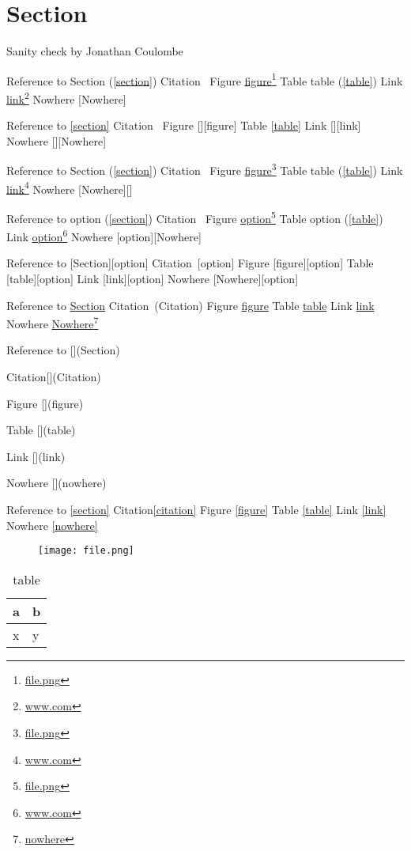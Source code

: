 
\def\mytitle{MultiMarkdown Sanity Test}

\part{Section}
\label{section}

Sanity check by Jonathan Coulombe

Reference to Section (\autoref{section})
Citation~\cite{Citation}
Figure \href{file.png}{figure}\footnote{\href{file.png}{file.png}}
Table table (\autoref{table})
Link \href{www.com}{link}\footnote{\href{www.com}{www.com}}
Nowhere [Nowhere]

Reference to \autoref{section}
Citation~\cite{Citation}
Figure [][figure]
Table \autoref{table}
Link [][link]
Nowhere [][Nowhere]

Reference to Section (\autoref{section})
Citation~\cite{Citation}
Figure \href{file.png}{figure}\footnote{\href{file.png}{file.png}}
Table table (\autoref{table})
Link \href{www.com}{link}\footnote{\href{www.com}{www.com}}
Nowhere [Nowhere][]

Reference to option (\autoref{section})
Citation~\cite[option]{Citation}
Figure \href{file.png}{option}\footnote{\href{file.png}{file.png}}
Table option (\autoref{table})
Link \href{www.com}{option}\footnote{\href{www.com}{www.com}}
Nowhere [option][Nowhere]

Reference to [Section][option]
Citation~\cite{Citation}[option]
Figure [figure][option]
Table [table][option]
Link [link][option]
Nowhere [Nowhere][option]

Reference to \href{Section}{Section}
Citation~\cite{Citation}(Citation)
Figure \href{figure}{figure}
Table \href{table}{table}
Link \href{link}{link}
Nowhere \href{nowhere}{Nowhere}\footnote{\href{nowhere}{nowhere}}

Reference to [](Section)

Citation[](Citation)

Figure [](figure)

Table [](table)

Link [](link)

Nowhere [](nowhere)

Reference to \autoref{section}
Citation\autoref{citation}
Figure \autoref{figure}
Table \autoref{table}
Link \autoref{link}
Nowhere \autoref{nowhere}

\begin{figure}[htbp]
\centering
\texttt{[image: file.png]}
\label{figure}
\end{figure}


\begin{table}[htbp]
\begin{minipage}{\linewidth}
\setlength{\tymax}{0.5\linewidth}
\centering
\small
\caption{table}
\label{table}
\begin{tabular}{@{}ll@{}} \toprule
a&b\\
\midrule
x&y\\

\bottomrule

\end{tabular}
\end{minipage}
\end{table}





